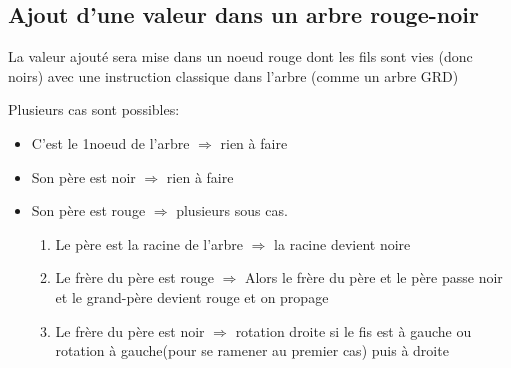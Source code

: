 \subsection{Ajout d'une valeur dans un arbre rouge-noir}
La valeur ajouté sera mise dans un noeud rouge dont les fils sont vies (donc noirs) avec une instruction classique dans l'arbre (comme un arbre GRD)

Plusieurs cas sont possibles:
\begin{itemize}
	\item C'est le 1\ier noeud de l'arbre $\Rightarrow$ rien à faire
	\item Son père est noir $\Rightarrow$ rien à faire
	\item Son père est rouge $\Rightarrow$ plusieurs sous cas.
		\begin{enumerate}
			\item Le père est la racine de l'arbre $\Rightarrow$ la racine devient noire
			\item Le frère du père est rouge $\Rightarrow$ Alors le frère du père et le père passe noir et le grand-père devient rouge et on propage
			\item Le frère du père est noir $\Rightarrow$ rotation droite si le fis est à gauche ou rotation à gauche(pour se ramener au premier cas) puis à droite
		\end{enumerate}
\end{itemize}

